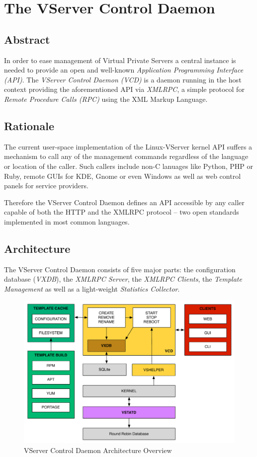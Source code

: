 \chapter{The VServer Control Daemon}


\section{Abstract}

In order to ease management of Virtual Private Servers a central instance is
needed to provide an open and well-known \emph{Application Programming
Interface (API)}.  The \emph{VServer Control Daemon (VCD)} is a daemon running
in the host context providing the aforementioned API via \emph{XMLRPC}, a
simple protocol for \emph{Remote Procedure Calls (RPC)} using the XML Markup
Language.


\section{Rationale}

The current user-space implementation of the Linux-VServer kernel API suffers a
mechanism to call any of the management commands regardless of the language or
location of the caller. Such callers include non-C lanuages like Python, PHP or
Ruby, remote GUIs for KDE, Gnome or even Windows as well as web control panels
for service providers.

Therefore the VServer Control Daemon defines an API accessible by any caller
capable of both the HTTP and the XMLRPC protocol -- two open standards
implemented in most common languages.


\section{Architecture}

The VServer Control Daemon consists of five major parts: the configuration
database (\emph{VXDB}), the \emph{XMLRPC Server}, the \emph{XMLRPC Clients},
the \emph{Template Management} as well as a light-weight \emph{Statistics
Collector}.

\begin{figure}[H]
	\center
	\includegraphics[scale=0.4]{intro/vcd}
	\caption{VServer Control Daemon Architecture Overview}
\end{figure}



